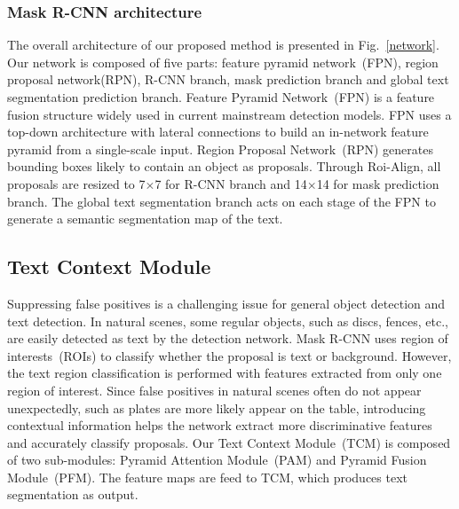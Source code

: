 \documentclass[letterpaper]{article} \usepackage{aaai19}  \usepackage{times}  \usepackage{helvet}  \usepackage{courier}  \usepackage{url}  \usepackage{graphicx}
\begin{document}
 \subsubsection{Mask R-CNN architecture}
The overall architecture of our proposed method is presented in Fig.~\ref{network}. Our network is composed of five parts: feature pyramid network~(FPN), region proposal network(RPN), R-CNN branch, mask prediction branch and global text segmentation prediction branch.
Feature Pyramid Network~(FPN) is a feature fusion structure widely used in current mainstream detection models. 
FPN uses a top-down architecture with lateral connections to build an in-network feature pyramid from a single-scale input.
Region Proposal Network~(RPN) generates bounding boxes likely to contain an object as proposals.
Through Roi-Align, all proposals are resized to 7$\times$7 for R-CNN branch and 14$\times$14 for mask prediction branch.
The global text segmentation branch acts on each stage of the FPN to generate a semantic segmentation map of the text. 





 \subsection{Text Context Module}
Suppressing false positives is a challenging issue for general object detection and text detection. 
In natural scenes, some regular objects, such as discs, fences, etc., are easily detected as text by the detection network.
Mask R-CNN uses region of interests~(ROIs) to classify whether the proposal is text or background.
However, the text region classification is performed with features extracted from only one region of interest.
Since false positives in natural scenes often do not appear unexpectedly, such as plates are more likely appear on the table, introducing contextual information helps the network extract more discriminative features and accurately classify proposals.
Our Text Context Module~(TCM) is composed of two sub-modules:
Pyramid Attention Module~(PAM) and Pyramid Fusion Module~(PFM).
The feature maps are feed to TCM, which produces text segmentation as output.
 



 
\end{document}
